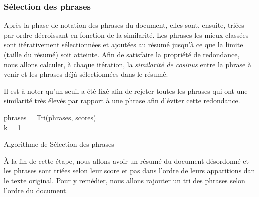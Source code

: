         \subsubsection{Sélection des phrases}
       Après la phase de notation des phrases du document, elles sont, ensuite, triées par ordre décroissant en fonction de la similarité. Les phrases les mieux classées sont itérativement sélectionnées et ajoutées au résumé jusqu'à ce que la limite (taille du résumé) soit atteinte. Afin de satisfaire la propriété de redondance, nous allons calculer, à chaque itération, la \emph{similarité de cosinus} entre la phrase à venir et les phrases déjà sélectionnées dans le résumé.

       Il est à noter qu'un seuil a été fixé afin de rejeter toutes les phrases qui ont une similarité très élevés par rapport à une phrase afin d'éviter cette redondance.

        \begin{algorithm2e}[H]
            \SetAlgoLined
            phrases = Tri(phrases, scores)\\
            k = 1\\
            \caption{Algorithme de Sélection des phrases}
        \end{algorithm2e}

        À la fin de cette étape, nous allons avoir un résumé du document désordonné et les phrases sont triées selon leur score et pas dans l'ordre de leurs apparitions dan le texte original. Pour y remédier, nous allons rajouter un tri des phrases selon l'ordre du document.
        
